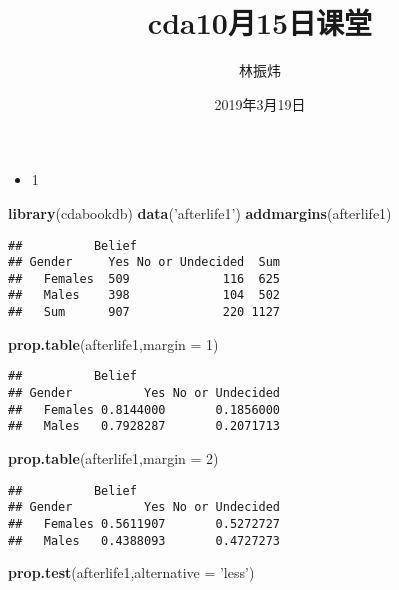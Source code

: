 \documentclass[12pt,hyperref,]{ctexart}
\title{cda10月15日课堂}
\author{林振炜}
\date{2019年3月19日}
\newenvironment{Shaded}{\begin{snugshade}}{\end{snugshade}}
\newcommand{\DataTypeTok}[1]{\textcolor[rgb]{0.13,0.29,0.53}{#1}}
\newcommand{\DecValTok}[1]{\textcolor[rgb]{0.00,0.00,0.81}{#1}}
\newcommand{\KeywordTok}[1]{\textcolor[rgb]{0.13,0.29,0.53}{\textbf{#1}}}
\newcommand{\NormalTok}[1]{#1}
\newcommand{\StringTok}[1]{\textcolor[rgb]{0.31,0.60,0.02}{#1}}
\providecommand{\tightlist}{%
  \setlength{\itemsep}{0pt}\setlength{\parskip}{0pt}}
\begin{document}
\maketitle

\begin{itemize}
\tightlist
\item
  1
\end{itemize}

\begin{Shaded}
\begin{Highlighting}[]
\KeywordTok{library}\NormalTok{(cdabookdb)}
\KeywordTok{data}\NormalTok{(}\StringTok{'afterlife1'}\NormalTok{)}
\KeywordTok{addmargins}\NormalTok{(afterlife1)}
\end{Highlighting}
\end{Shaded}

\begin{verbatim}
##          Belief
## Gender     Yes No or Undecided  Sum
##   Females  509             116  625
##   Males    398             104  502
##   Sum      907             220 1127
\end{verbatim}

\begin{Shaded}
\begin{Highlighting}[]
\KeywordTok{prop.table}\NormalTok{(afterlife1,}\DataTypeTok{margin =} \DecValTok{1}\NormalTok{)}
\end{Highlighting}
\end{Shaded}

\begin{verbatim}
##          Belief
## Gender          Yes No or Undecided
##   Females 0.8144000       0.1856000
##   Males   0.7928287       0.2071713
\end{verbatim}

\begin{Shaded}
\begin{Highlighting}[]
\KeywordTok{prop.table}\NormalTok{(afterlife1,}\DataTypeTok{margin =} \DecValTok{2}\NormalTok{)}
\end{Highlighting}
\end{Shaded}

\begin{verbatim}
##          Belief
## Gender          Yes No or Undecided
##   Females 0.5611907       0.5272727
##   Males   0.4388093       0.4727273
\end{verbatim}

\begin{Shaded}
\begin{Highlighting}[]
\KeywordTok{prop.test}\NormalTok{(afterlife1,}\DataTypeTok{alternative =} \StringTok{'less'}\NormalTok{)}
\end{Highlighting}
\end{Shaded}
\end{document}
